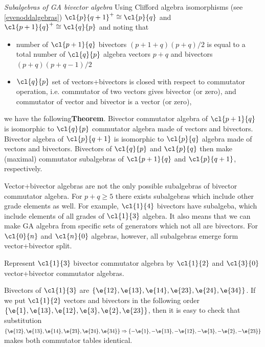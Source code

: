 \begin{example}
\begin{unit}\textit{Subalgebras of GA bivector algebra}
Using Clifford algebra isomorphisms (see \ref{evenoddalgebras}) $\cl{p}{q+1}^+\cong\cl{p}{q}$ and $\cl{p+1}{q}^+\cong\cl{q}{p}$ and noting that
\begin{itemize}
\item number of $\cl{p+1}{q}$  bivectors $(p+1+q)(p+q)/2$ is equal
to a total number of $\cl{q}{p}$ algebra vectors $p+q$ and
bivectors $(p+q)(p+q-1)/2$ \item $\cl{q}{p}$ set of
vectors+bivectors is closed with respect  to commutator operation,
i.e. commutator of two vectors gives bivector (or zero), and
commutator of vector and bivector is a vector (or zero),
\end{itemize}
we have the following\newline \textbf{Theorem}. Bivector
commutator  algebra of $\cl{p+1}{q}$ is isomorphic to $\cl{q}{p}$
commutator algebra made of vectors and bivectors. Bivector algebra
of $\cl{p}{q+1}$ is isomorphic to $\cl{p}{q}$ algebra made of
vectors and bivectors. Bivectors of $\cl{q}{p}$ and $\cl{p}{q}$
then make (maximal) commutator subalgebras of $\cl{p+1}{q}$ and
$\cl{p}{q+1}$, respectively.

Vector+bivector algebras are not the only possible subalgebras of
bivector commutator algebra.  For $p+q\ge5$ there exists
subalgebras which include other grade elements as well. For
example, $\cl{1}{4}$ bivectors have subalgeba, which include
elements of all grades of $\cl{1}{3}$ algebra. It also means that
we can make GA algebra from specific sets of generators which not
all are bivectors. For  $\cl{0}{n}$ and $\cl{n}{0}$ algebras,
however, all subalgebras emerge form vector+bivector split.
\end{unit}
\begin{example}
Represent $\cl{1}{3}$ bivector commutator algebra by $\cl{1}{2}$
and $\cl{3}{0}$ vector+bivector commutator algebras.

Bivectors of $\cl{1}{3}$ are $\{\e{12},\e{13},\e{14},\e{23},\e{24},\e{34}\}$. If we put $\cl{1}{2}$ vectors and bivectors in the following order $\{\e{1},\e{13},\e{12},\e{3},\e{2},\e{23}\}$, then it is easy to check that substitution $\{\e{12},\e{13},\e{14},\e{23},\e{24},\e{34}\}\Rightarrow \{-\e{1},-\e{13},-\e{12},-\e{3},-\e{2},-\e{23}\}$
makes both commutator tables identical.


\end{example}
\end{example}

